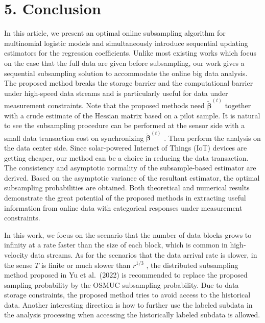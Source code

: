 \section{5. Conclusion}\label{conclusion}

In this article, we present an optimal online subsampling algorithm for
multinomial logistic models and simultaneously introduce sequential
updating estimators for the regression coefficients. Unlike most
existing works which focus on the case that the full data are given
before subsampling, our work gives a sequential subsampling solution to
accommodate the online big data analysis. The proposed method breaks the
storage barrier and the computational barrier under high-speed data
streams and is particularly useful for data under measurement
constraints. Note that the proposed methods need
\(\tilde { \boldsymbol { \beta } } ^ { ( t ) }\) together with a crude
estimate of the Hessian matrix based on a pilot sample. It is natural to
see the subsampling procedure can be performed at the sensor side with a
small data transaction cost on synchronizing
\(\tilde { \boldsymbol { \beta } } ^ { ( t ) }\) . Then perform the
analysis on the data center side. Since solar-powered Internet of Things
(IoT) devices are getting cheaper, our method can be a choice in
reducing the data transaction. The consistency and asymptotic normality
of the subsample-based estimator are derived. Based on the asymptotic
variance of the resultant estimator, the optimal subsampling
probabilities are obtained. Both theoretical and numerical results
demonstrate the great potential of the proposed methods in extracting
useful information from online data with categorical responses under
measurement constraints.

In this work, we focus on the scenario that the number of data blocks
grows to infinity at a rate faster than the size of each block, which is
common in high-velocity data streams. As for the scenarios that the data
arrival rate is slower, in the sense \(T\) is finite or much slower than
\(r ^ { 1 / 3 }\) , the distributed subsampling method proposed in Yu et
al.~(2022) is recommended to replace the proposed sampling probability
by the OSMUC subsampling probability. Due to data storage constraints,
the proposed method tries to avoid access to the historical data.
Another interesting direction is how to further use the labeled subdata
in the analysis processing when accessing the historically labeled
subdata is allowed.
